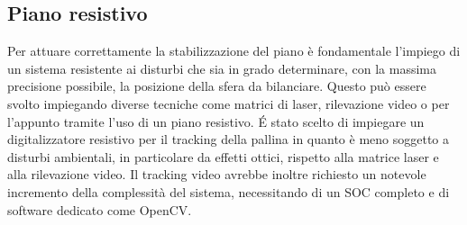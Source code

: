 \documentclass[11pt]{article}
\begin{document}
\subsection{Piano resistivo}\label{pianoresistivo}
Per attuare correttamente la stabilizzazione del piano è fondamentale l'impiego di un sistema resistente ai disturbi che sia in grado determinare, con la massima precisione possibile, la posizione della sfera da bilanciare. Questo può essere svolto impiegando diverse tecniche come matrici di laser, rilevazione video o per l'appunto tramite l'uso di un piano resistivo.
É stato scelto di impiegare un digitalizzatore resistivo per il tracking della pallina in quanto è meno soggetto a disturbi ambientali, in particolare da effetti ottici, rispetto alla matrice laser e alla rilevazione video.
Il tracking video avrebbe inoltre richiesto un notevole incremento della complessità del sistema, necessitando di un SOC completo e di software dedicato come OpenCV.
\end{document}
